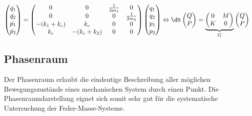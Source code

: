 \begin{equation}
    \label{kra:hamilton:multispringmass}
    \begin{pmatrix}
        \dot{q_1} \\
        \dot{q_2} \\
        \dot{p_1} \\
        \dot{p_2} \\
    \end{pmatrix}
    =
    \begin{pmatrix}
        0            & 0            & \frac{1}{2m_1} & 0              \\
        0            & 0            & 0              & \frac{1}{2m_2} \\
        -(k_1 + k_c) & k_c          & 0              & 0              \\
        k_c          & -(k_c + k_2) & 0              & 0              \\
    \end{pmatrix}
    \begin{pmatrix}
        q_1 \\
        q_2 \\
        p_1 \\
        p_2 \\
    \end{pmatrix}
    \Leftrightarrow
    \dt
    \begin{pmatrix}
        Q \\
        P \\
    \end{pmatrix}
    =
    \underbrace{
        \begin{pmatrix}
            0 & M \\
            K & 0
        \end{pmatrix}
    }_{G}
    \begin{pmatrix}
        Q \\
        P \\
    \end{pmatrix}
\end{equation}

\subsection{Phasenraum}
Der Phasenraum erlaubt die eindeutige Beschreibung aller möglichen Bewegungszustände eines mechanischen System durch einen Punkt.
Die Phasenraumdarstellung eignet sich somit sehr gut für die systematische Untersuchung der Feder-Masse-Systeme.

